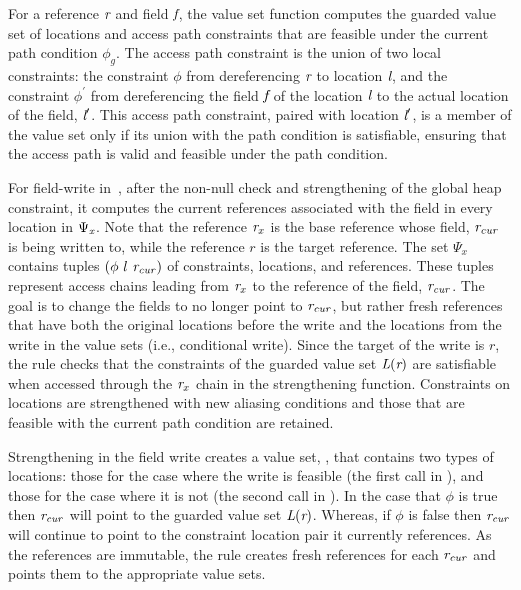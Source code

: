   

For a reference $\emph{r}$ and field $\emph{f}$, the value set function computes 
the guarded value set of locations and access path constraints
that are feasible under the current path condition $\phi_g$.
The access path constraint is the union of two local constraints: 
the constraint $\phi$ from dereferencing $\emph{r}$ to location $\emph{l}$, 
and the constraint $\phi^\prime$ from dereferencing the field $\emph{f}$ of the location $\emph{l}$ to the actual location of the field, $\emph{l}^\prime$. 
This access path constraint, paired with location $\emph{l}^\prime$, is a member of the value set only if its union with the path condition is satisfiable, ensuring that the access path is valid and feasible under the path condition.


For field-write in~, after the non-null check and
strengthening of the global heap constraint, it computes the current
references associated with the field in every location in
$\Psi_{\emph{x}}$. Note that the reference $\emph{r}_x$ is the base
reference whose field, $\emph{r}_\mathit{cur}$ is being written to,
while the reference $r$ is the target reference. The set $\Psi_x$
contains tuples $(\phi\ l\ \cfgnt{r}_\mathit{cur})$ of constraints,
locations, and references. These tuples represent access chains
leading from $\emph{r}_x$ to the reference of the field,
$\emph{r}_\mathit{cur}$. The goal is to change the fields to no
longer point to $\emph{r}_\mathit{cur}$, but rather fresh references
that have both the original locations before the write and the
locations from the write in the value sets (i.e., conditional
write). Since the target of the write is $r$, the rule checks that the
constraints of the guarded value set $\emph{L}(\emph{r})$ are satisfiable
when accessed through the $\emph{r}_x$ chain in the strengthening
function.   Constraints on locations are strengthened
with new aliasing conditions and those that are feasible with the
current path condition are retained.

Strengthening in the field write creates a value set, ,  that contains two
types of locations: those for the case where the write is feasible
(the first call in ), and those for the case where it is not (the second
call in ). In the case that $\phi$ is true then $\emph{r}_\mathit{cur}$
will point to the guarded value set $\emph{L}(\emph{r})$.
Whereas, if $\phi$ is false then $\emph{r}_\mathit{cur}$ will
continue to point to the constraint location pair it currently
references.  As the references are immutable, the rule creates fresh
references for each $\emph{r}_\mathit{cur}$ and points them to the
appropriate value sets.

